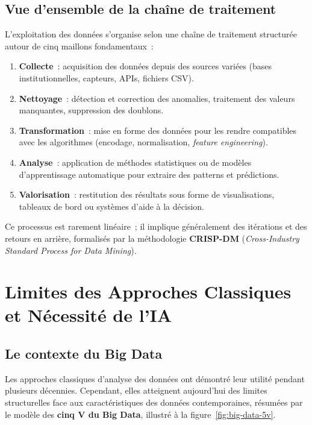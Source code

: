 \subsection{Vue d'ensemble de la chaîne de traitement}

L'exploitation des données s'organise selon une chaîne de traitement structurée autour de cinq maillons fondamentaux~:

\begin{enumerate}[leftmargin=1.5cm, itemsep=4pt]
  \item \textbf{Collecte}~: acquisition des données depuis des sources variées (bases institutionnelles, capteurs, APIs, fichiers CSV).
  \item \textbf{Nettoyage}~: détection et correction des anomalies, traitement des valeurs manquantes, suppression des doublons.
  \item \textbf{Transformation}~: mise en forme des données pour les rendre compatibles avec les algorithmes (encodage, normalisation, \textit{feature engineering}).
  \item \textbf{Analyse}~: application de méthodes statistiques ou de modèles d'apprentissage automatique pour extraire des patterns et prédictions.
  \item \textbf{Valorisation}~: restitution des résultats sous forme de visualisations, tableaux de bord ou systèmes d'aide à la décision.
\end{enumerate}

Ce processus est rarement linéaire~; il implique généralement des itérations et des retours en arrière, formalisés par la méthodologie \textbf{CRISP-DM} (\textit{Cross-Industry Standard Process for Data Mining}).

\section{Limites des Approches Classiques et Nécessité de l'IA}

\subsection{Le contexte du Big Data}

Les approches classiques d'analyse des données ont démontré leur utilité pendant plusieurs décennies. Cependant, elles atteignent aujourd'hui des limites structurelles face aux caractéristiques des données contemporaines, résumées par le modèle des \textbf{cinq V du Big Data}, illustré à la figure~\ref{fig:big-data-5v}.

